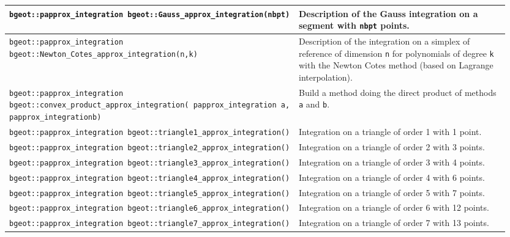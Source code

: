\begin{center} \begin{tabular}{|m{0.55\linewidth}|m{0.4\linewidth}|} \hline
{\tt bgeot::papprox\_integration bgeot::Gauss\_approx\_integration(nbpt)} & Description of the Gauss integration on a segment with {\tt nbpt} points. \\ \hline
{\tt bgeot::papprox\_integration bgeot::Newton\_Cotes\_approx\_integration(n,\;k)} & Description of the integration on a simplex of reference of dimension {\tt n} for polynomials of degree {\tt k} with the Newton Cotes method (based on Lagrange interpolation).\\ \hline
{\tt bgeot::papprox\_integration bgeot::convex\_product\_approx\_integration( papprox\_integration a, papprox\_integration\;b)} & Build a method doing the direct product of methods {\tt a} and {\tt b}. \\ \hline

{\tt bgeot::papprox\_integration bgeot::triangle1\_approx\_integration()} & Integration on a triangle of order 1 with 1 point. \\ \hline

{\tt bgeot::papprox\_integration bgeot::triangle2\_approx\_integration()} & Integration on a triangle of order 2 with 3 points. \\ \hline

{\tt bgeot::papprox\_integration bgeot::triangle3\_approx\_integration()} & Integration on a triangle of order 3 with 4 points. \\ \hline

{\tt bgeot::papprox\_integration bgeot::triangle4\_approx\_integration()} & Integration on a triangle of order 4 with 6 points. \\ \hline

{\tt bgeot::papprox\_integration bgeot::triangle5\_approx\_integration()} & Integration on a triangle of order 5 with 7 points. \\ \hline

{\tt bgeot::papprox\_integration bgeot::triangle6\_approx\_integration()} & Integration on a triangle of order 6 with 12 points. \\ \hline

{\tt bgeot::papprox\_integration bgeot::triangle7\_approx\_integration()} & Integration on a triangle of order 7 with 13 points. \\ \hline

\end{tabular} \end{center}

